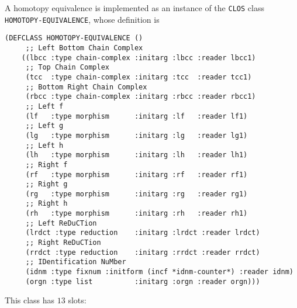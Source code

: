 A homotopy equivalence is implemented as an instance
of the {\tt CLOS}  class {\tt HOMOTOPY-EQUIVALENCE},
whose definition is
{\footnotesize\begin{verbatim}
(DEFCLASS HOMOTOPY-EQUIVALENCE ()
     ;; Left Bottom Chain Complex
    ((lbcc :type chain-complex :initarg :lbcc :reader lbcc1)
     ;; Top Chain Complex
     (tcc  :type chain-complex :initarg :tcc  :reader tcc1)
     ;; Bottom Right Chain Complex
     (rbcc :type chain-complex :initarg :rbcc :reader rbcc1)
     ;; Left f
     (lf   :type morphism      :initarg :lf   :reader lf1)
     ;; Left g
     (lg   :type morphism      :initarg :lg   :reader lg1)
     ;; Left h
     (lh   :type morphism      :initarg :lh   :reader lh1)
     ;; Right f
     (rf   :type morphism      :initarg :rf   :reader rf1)
     ;; Right g
     (rg   :type morphism      :initarg :rg   :reader rg1)
     ;; Right h
     (rh   :type morphism      :initarg :rh   :reader rh1)
     ;; Left ReDuCTion
     (lrdct :type reduction    :initarg :lrdct :reader lrdct)
     ;; Right ReDuCTion
     (rrdct :type reduction    :initarg :rrdct :reader rrdct)
     ;; IDentification NuMber
     (idnm :type fixnum :initform (incf *idnm-counter*) :reader idnm)
     (orgn :type list          :initarg :orgn :reader orgn)))
\end{verbatim}}
This class has  $13$  slots:
